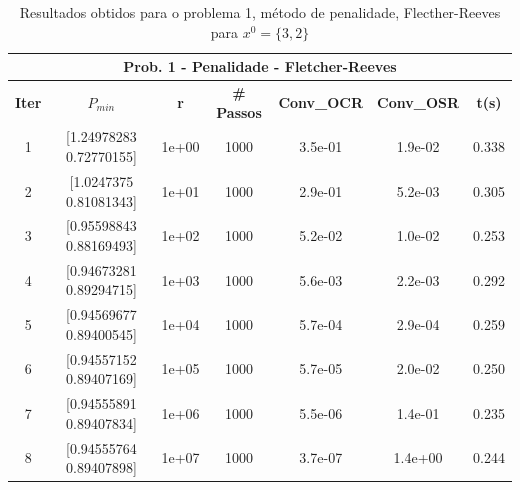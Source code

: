 \documentclass[10pt, a4paper]{article}
\begin{document}
\vspace{5mm}
\begin{table}[H]
  \begin{center}
    \begin{tabular}{c|c|c|c|c|c|c}
      \multicolumn{7}{c}{\textbf{Prob. 1 - Penalidade - Fletcher-Reeves}}\\
      \hline
      \textbf{Iter} & \textbf{$P_{min}$} & \textbf{r} & \textbf{\# Passos} & \textbf{Conv\_OCR} & \textbf{Conv\_OSR} & \textbf{t(s)}\\
      \hline
        1& [1.24978283 0.72770155]& 1e+00& 1000& 3.5e-01& 1.9e-02& 0.338\\
        2& [1.0247375  0.81081343]& 1e+01& 1000& 2.9e-01& 5.2e-03& 0.305\\
        3& [0.95598843 0.88169493]& 1e+02& 1000& 5.2e-02& 1.0e-02& 0.253\\
        4& [0.94673281 0.89294715]& 1e+03& 1000& 5.6e-03& 2.2e-03& 0.292\\
        5& [0.94569677 0.89400545]& 1e+04& 1000& 5.7e-04& 2.9e-04& 0.259\\
        6& [0.94557152 0.89407169]& 1e+05& 1000& 5.7e-05& 2.0e-02& 0.250\\
        7& [0.94555891 0.89407834]& 1e+06& 1000& 5.5e-06& 1.4e-01& 0.235\\
        8& [0.94555764 0.89407898]& 1e+07& 1000& 3.7e-07& 1.4e+00& 0.244\\
    \end{tabular}
  \end{center}
  \caption{Resultados obtidos para o problema 1, método de penalidade, Flecther-Reeves para $x^0=\{3,2\}$}
\end{table}
\end{document}
